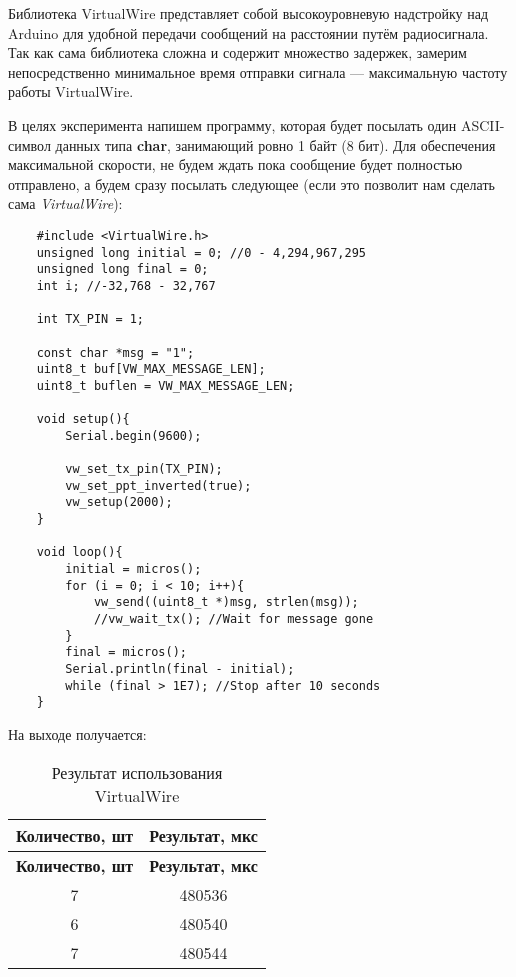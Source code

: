 Библиотека VirtualWire представляет собой высокоуровневую надстройку над Arduino для удобной передачи сообщений на расстоянии путём радиосигнала. Так как сама библиотека сложна и содержит множество задержек, замерим непосредственно минимальное время отправки сигнала --- максимальную частоту работы VirtualWire.

В целях эксперимента напишем программу, которая будет посылать один ASCII-символ данных типа \textbf{char}, занимающий ровно 1 байт (8 бит). Для обеспечения максимальной скорости, не будем ждать пока сообщение будет полностью отправлено, а будем сразу посылать следующее (если это позволит нам сделать сама \textit{VirtualWire}):

\begin{verbatim}
    #include <VirtualWire.h>
    unsigned long initial = 0; //0 - 4,294,967,295
    unsigned long final = 0;
    int i; //-32,768 - 32,767

    int TX_PIN = 1;

    const char *msg = "1";
    uint8_t buf[VW_MAX_MESSAGE_LEN];
    uint8_t buflen = VW_MAX_MESSAGE_LEN;

    void setup(){
        Serial.begin(9600);

        vw_set_tx_pin(TX_PIN);
        vw_set_ppt_inverted(true);
        vw_setup(2000);
    }

    void loop(){
        initial = micros();
        for (i = 0; i < 10; i++){
            vw_send((uint8_t *)msg, strlen(msg));
            //vw_wait_tx(); //Wait for message gone
        }
        final = micros();
        Serial.println(final - initial);
        while (final > 1E7); //Stop after 10 seconds
    }
\end{verbatim}

На выходе получается:

\begin{longtable}[c]{|c|c|}
    \caption{Результат использования VirtualWire}
    \label{VirtualWireResult}\\
    \hline
    \textbf{Количество, шт} & \textbf{Результат, мкс}\\
    \hline
    \endfirsthead
    \hline
    \textbf{Количество, шт} & \textbf{Результат, мкс}\\
    \hline
    \endhead
        7 & 480536\\
        \hline
        6 & 480540\\
        \hline
        7 & 480544\\
        \hline
\end{longtable}

